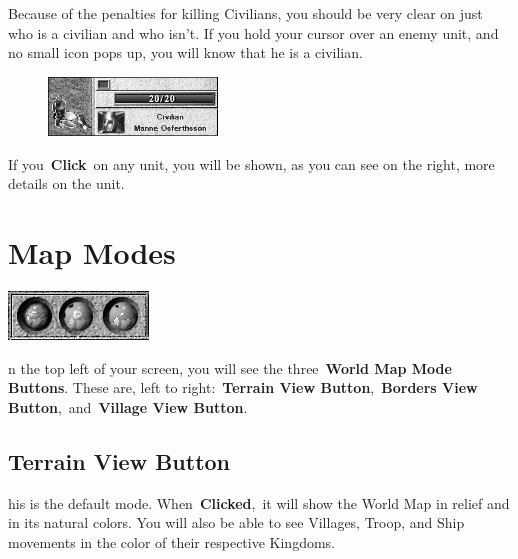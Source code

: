 Because of the penalties for killing Civilians, you should be very clear on just who is a civilian and who isn’t. If you hold your cursor over an enemy unit, and no small icon pops up, you will know that he is a civilian.

\begin{figure}
\vspace{-20pt}
	\begin{center}
		\includegraphics[width=0.4\textwidth]{Ipeasant2}
\end{center}
\vspace{-20pt}
\end{figure}

If you \textbf{Click} on any unit, you will be shown, as you can see on the right, more details on the unit. \\

\section{Map Modes}

\begin{center}
	\includegraphics[width=0.4\linewidth]{Imapmode}
\end{center}

n the top left of your screen, you will see the three \textbf{World Map Mode Buttons}. These are, left to right: \textbf{Terrain View Button}, \textbf{Borders View Button}, and \textbf{Village View Button}.

\subsection{Terrain View Button}


his is the default mode. When \textbf{Clicked}, it will show the World Map in relief and in its natural colors. You will also be able to see Villages, Troop, and Ship movements in the color of their respective Kingdoms.

